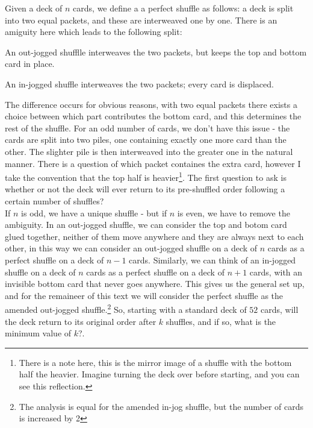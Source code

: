 \documentclass[../Axiomathic.tex]{subfiles}
\begin{document}
Given a deck of $n$ cards, we define a a perfect shuffle as follows: a deck is split into two equal packets, and these are interweaved one by one. There is an amiguity here which leads to the following split: \\
\begin{defn} An out-jogged shufflle interweaves the two packets, but keeps the top and bottom card in place. \end{defn}
\begin{defn}  An in-jogged shuffle interweaves the two packets; every card is displaced. \end{defn}
The difference occurs for obvious reasons, with two equal packets there exists a choice between which part contributes the bottom card, and this determines the rest of the shuffle. For an odd number of cards, we don't have this issue - the cards are split into two piles, one containing exactly one more card than the other. The slighter pile is then interweaved into the greater one in the natural manner. There is a question of which packet containes the extra card, however I take the convention that the top half is heavier\footnote{There is a note here, this is the mirror image of a shuffle with the bottom half the heavier. Imagine turning the deck over before starting, and you can see this  reflection.}. The first question to ask is whether or not the deck will ever return to its pre-shuffled order following a certain number of shuffles? \\
If $n$ is odd, we have a unique shuffle - but if $n$ is even, we have to remove the ambiguity. In an out-jogged shuffle, we can consider the top and botom card glued together, neither of them move anywhere and they are always next to each other, in this way we can consider an out-jogged shuffle on a deck of $n$ cards as a perfect shuffle on a deck of $n-1$ cards. Similarly, we can think of an in-jogged shuffle on a deck of $n$ cards as a perfect shuffle on a deck of $n+1$ cards, with an invisible bottom card that never goes anywhere. This gives us the general set up, and for the remaineer of this text we will consider the perfect shuffle as the amended out-jogged shuffle.\footnote{The analysis is equal for the amended in-jog shuffle, but the number of cards is increased by 2} So, starting with a standard deck of $52$ cards, will the deck return to its original order after $k$ shuffles, and if so, what is the minimum value of $k$?.
\end{document}
